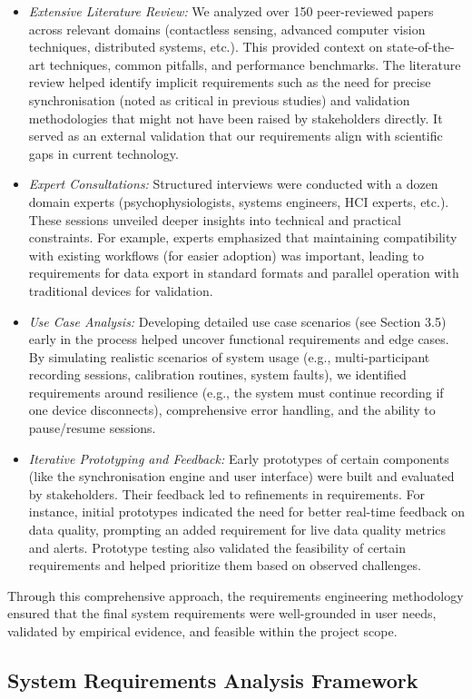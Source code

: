\documentclass[11pt,a4paper]{report}
\begin{document}
\begin{itemize}
\item \textit{Extensive Literature Review:} We analyzed over 150 peer-reviewed papers across relevant domains (contactless sensing, advanced computer vision techniques, distributed systems, etc.). This provided context on state-of-the-art techniques, common pitfalls, and performance benchmarks. The literature review helped identify implicit requirements such as the need for precise synchronisation (noted as critical in previous studies) and validation methodologies that might not have been raised by stakeholders directly. It served as an external validation that our requirements align with scientific gaps in current technology.
\item \textit{Expert Consultations:} Structured interviews were conducted with a dozen domain experts (psychophysiologists, systems engineers, HCI experts, etc.). These sessions unveiled deeper insights into technical and practical constraints. For example, experts emphasized that maintaining compatibility with existing workflows (for easier adoption) was important, leading to requirements for data export in standard formats and parallel operation with traditional devices for validation.
\item \textit{Use Case Analysis:} Developing detailed use case scenarios (see Section 3.5) early in the process helped uncover functional requirements and edge cases. By simulating realistic scenarios of system usage (e.g., multi-participant recording sessions, calibration routines, system faults), we identified requirements around resilience (e.g., the system must continue recording if one device disconnects), comprehensive error handling, and the ability to pause/resume sessions.
\item \textit{Iterative Prototyping and Feedback:} Early prototypes of certain components (like the synchronisation engine and user interface) were built and evaluated by stakeholders. Their feedback led to refinements in requirements. For instance, initial prototypes indicated the need for better real-time feedback on data quality, prompting an added requirement for live data quality metrics and alerts. Prototype testing also validated the feasibility of certain requirements and helped prioritize them based on observed challenges.
\end{itemize} Through this comprehensive approach, the requirements engineering methodology ensured that the final system requirements were well-grounded in user needs, validated by empirical evidence, and feasible within the project scope. \subsection{System Requirements Analysis Framework}
\end{document}
